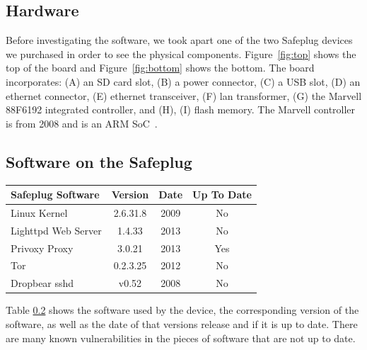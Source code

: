 \documentclass[letterpaper,twocolumn,10pt]{article}
\begin{document}
\subsection{Hardware}
Before investigating the software, we took apart one of the two Safeplug devices we purchased in order to see the physical components.  Figure~\ref{fig:top} shows the top of the board and Figure~\ref{fig:bottom} shows the bottom.  The board incorporates: (A) an SD card slot, (B) a power connector, (C) a USB slot, (D) an ethernet connector, (E) ethernet transceiver, (F) lan transformer, (G) the Marvell 88F6192 integrated controller, and (H), (I) flash memory.  The Marvell controller is from 2008 and is an ARM SoC~\cite{marvellhw}. 

\subsection{Software on the Safeplug}
\label{versions}
\begin{center}
  \begin{tabular}{|l|c|c|c|}
    \hline
    Safeplug Software & Version & Date & Up To Date\\ \hline
    Linux Kernel & 2.6.31.8 & 2009 & No\\ \hline
    Lighttpd Web Server & 1.4.33 & 2013 & No\\ \hline
    Privoxy Proxy & 3.0.21 & 2013 & Yes\\ \hline
    Tor & 0.2.3.25 & 2012 & No\\ \hline
    Dropbear sshd & v0.52 & 2008 & No\\ \hline
  \end{tabular}
\end{center}

Table \ref{versions} shows the software used by the device, the corresponding version of the software, as well as the date of that versions release and if it is up to date.  There are many known vulnerabilities in the pieces of software that are not up to date.  
\end{document}
